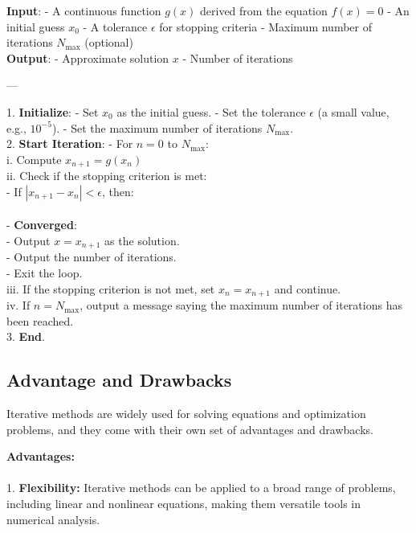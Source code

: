 \documentclass[12pt,a4paper]{article}
\begin{document}
	
	\textbf{Input}: 
	- A continuous function \( g(x) \) derived from the equation \( f(x) = 0 \)
	- An initial guess \( x_0 \)
	- A tolerance \( \epsilon \) for stopping criteria
	- Maximum number of iterations \( N_{\text{max}} \) (optional)\\
	
	\textbf{Output}: 
	- Approximate solution \( x \)
	- Number of iterations
	
	---
	
	1. \textbf{Initialize}:
	- Set \( x_0 \) as the initial guess.
	- Set the tolerance \( \epsilon \) (a small value, e.g., \( 10^{-5} \)).
	- Set the maximum number of iterations \( N_{\text{max}} \). \\
	
	2. \textbf{Start Iteration}:
	- For \( n = 0 \) to \( N_{\text{max}} \):\\
	i. Compute \( x_{n+1} = g(x_n) \)\\
	ii. Check if the stopping criterion is met:\\
	- If \( |x_{n+1} - x_n| < \epsilon \), then:\\ \\
	
	- \textbf{Converged}:\\
	- Output \( x = x_{n+1} \) as the solution.\\
	- Output the number of iterations.\\
	- Exit the loop.\\
	
	iii. If the stopping criterion is not met, set \( x_n = x_{n+1} \) and continue.\\
	
	iv. If \( n = N_{\text{max}} \), output a message saying the maximum number of iterations has been reached.\\
	
	3. \textbf{End}.
	
	
	
	
	\subsection{Advantage and Drawbacks}
	Iterative methods are widely used for solving equations and optimization problems, and they come with their own set of advantages and drawbacks.
	
	\textbf{Advantages:}\\ \\
	1. \textbf{Flexibility:} Iterative methods can be applied to a broad range of problems, including linear and nonlinear equations, making them versatile tools in numerical analysis.\\
	
\end{document}
